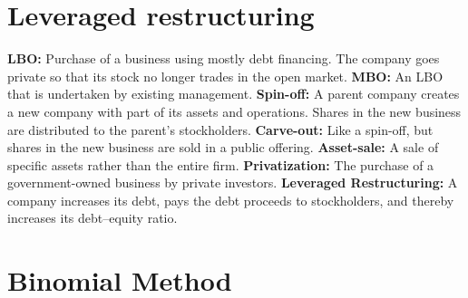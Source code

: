 \documentclass{cheatsheet}
\begin{document}
\section{Leveraged restructuring}
\textbf{LBO:} Purchase of a business using mostly debt financing. The company goes private so that its stock
no longer trades in the open market.
\textbf{MBO:} An LBO that is undertaken by existing management.
\textbf{Spin-off:} A parent company creates a new company with part of its assets and operations. Shares in
the new business are distributed to the parent’s stockholders.
\textbf{Carve-out:} Like a spin-off, but shares in the new business are sold in a public offering.
\textbf{Asset-sale:} A sale of specific assets rather than the entire firm.
\textbf{Privatization:} The purchase of a government-owned business by private investors.
\textbf{Leveraged Restructuring:} A company increases its debt, pays the debt proceeds to stockholders, and
thereby increases its debt–equity ratio.


\section*{Binomial Method}
\end{document}
